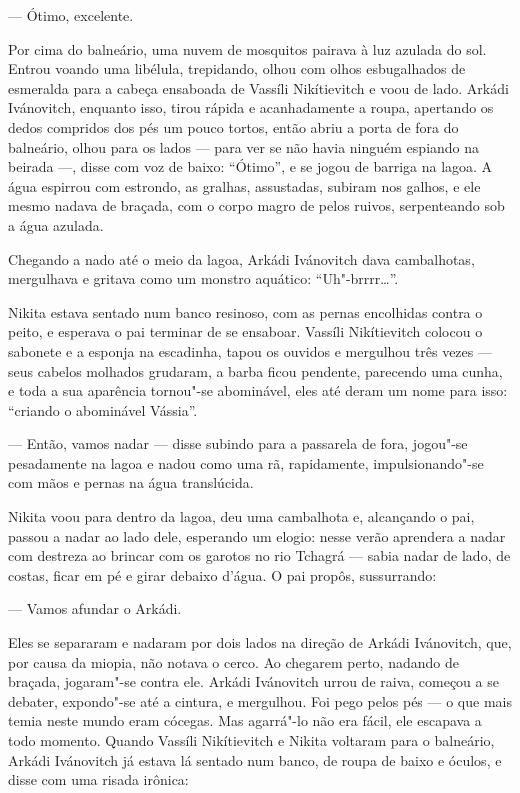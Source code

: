 --- Ótimo, excelente.

Por cima do balneário, uma nuvem de mosquitos pairava à luz azulada do
sol. Entrou voando uma libélula, trepidando, olhou com olhos
esbugalhados de esmeralda para a cabeça ensaboada de Vassíli
Nikítievitch e voou de lado. Arkádi Ivánovitch, enquanto isso, tirou
rápida e acanhadamente a roupa, apertando os dedos compridos dos pés um
pouco tortos, então abriu a porta de fora do balneário, olhou para os
lados --- para ver se não havia ninguém espiando na beirada ---, disse com
voz de baixo: ``Ótimo'', e se jogou de barriga na lagoa. A água espirrou
com estrondo, as gralhas, assustadas, subiram nos galhos, e ele mesmo
nadava de braçada, com o corpo magro de pelos ruivos, serpenteando sob a
água azulada.

Chegando a nado até o meio da lagoa, Arkádi Ivánovitch dava cambalhotas,
mergulhava e gritava como um monstro aquático: ``Uh"-brrrr\ldots{}''.

Nikita estava sentado num banco resinoso, com as pernas encolhidas
contra o peito, e esperava o pai terminar de se ensaboar. Vassíli
Nikítievitch colocou o sabonete e a esponja na escadinha, tapou os
ouvidos e mergulhou três vezes --- seus cabelos molhados grudaram, a
barba ficou pendente, parecendo uma cunha, e toda a sua aparência
tornou"-se abominável, eles até deram um nome para isso: ``criando o
abominável Vássia''.

--- Então, vamos nadar --- disse subindo para a passarela de fora,
jogou"-se pesadamente na lagoa e nadou como uma rã, rapidamente,
impulsionando"-se com mãos e pernas na água translúcida.

Nikita voou para dentro da lagoa, deu uma cambalhota e, alcançando o
pai, passou a nadar ao lado dele, esperando um elogio: nesse verão
aprendera a nadar com destreza ao brincar com os garotos no rio Tchagrá
--- sabia nadar de lado, de costas, ficar em pé e girar debaixo d'água.
O pai propôs, sussurrando:

--- Vamos afundar o Arkádi.

Eles se separaram e nadaram por dois lados na direção de Arkádi
Ivánovitch, que, por causa da miopia, não notava o cerco. Ao chegarem
perto, nadando de braçada, jogaram"-se contra ele. Arkádi Ivánovitch
urrou de raiva, começou a se debater, expondo"-se até a
cintura, e mergulhou. Foi pego pelos pés --- o que mais temia neste
mundo eram cócegas. Mas agarrá"-lo não era fácil, ele escapava a todo
momento. Quando Vassíli Nikítievitch e Nikita voltaram para o
balneário, Arkádi Ivánovitch já estava lá sentado num banco, de roupa de
baixo e óculos, e disse com uma risada irônica:

